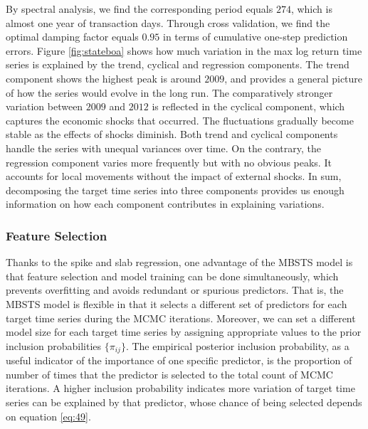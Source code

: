 \documentclass[twoside,11pt]{article}
\begin{document}
By spectral analysis, we find the corresponding period equals $274$, which is almost one year of transaction days. Through cross validation, we find the optimal damping factor equals $0.95$ in terms of cumulative one-step prediction errors. Figure \ref{fig:stateboa} shows how much variation in the max log return time series is explained by the trend, cyclical and regression components. The trend component shows the highest peak is around $2009$, and provides a general picture of how the series would evolve in the long run. The comparatively stronger variation between $2009$ and $2012$ is reflected in the cyclical component, which captures the economic shocks that occurred. The fluctuations gradually become stable as the effects of shocks diminish. Both trend and cyclical components handle the series with unequal variances over time. On the contrary, the regression component varies more frequently but with no obvious peaks. It accounts for local movements without the impact of external shocks. In sum, decomposing the target time series into three components provides us enough information on how each component contributes in explaining variations.

\subsubsection{Feature Selection}


Thanks to the spike and slab regression, one advantage of the MBSTS model is that feature selection and model training can be done simultaneously, which prevents overfitting and avoids redundant or spurious predictors. That is, the MBSTS model is flexible in that it selects a different set of predictors for each target time series during the MCMC iterations. Moreover, we can set a different model size for each target time series by assigning appropriate values to the prior inclusion probabilities $\{\pi_{ij}\}$. The empirical posterior inclusion probability, as a useful indicator of the importance of one specific predictor, is the proportion of number of times that the predictor is selected to the total count of MCMC iterations. A higher inclusion probability indicates more variation of target time series can be explained by that predictor, whose chance of being selected depends on equation \eqref{eq:49}.
\end{document}
